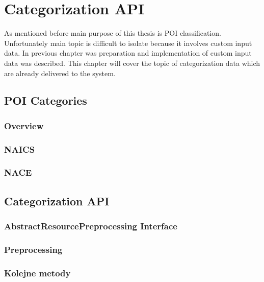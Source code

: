 \chapter{Categorization API}
As mentioned before main purpose of this thesis is POI classification. Unfortunately main topic is difficult to isolate because it involves custom input data. In previous chapter was preparation and implementation of custom input data was described. This chapter will cover the topic of categorization data which are already delivered to the system.

\section{POI Categories}

\subsection{Overview}
\subsection{NAICS}
\subsection{NACE}

\section{Categorization API}

\subsection{AbstractResourcePreprocessing Interface}

\subsection{Preprocessing}

\subsection{Kolejne metody}
